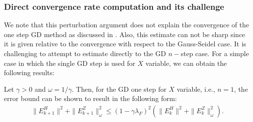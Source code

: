 \subsubsection{Direct convergence rate computation and its challenge}

We note that this perturbation argument does not explain the convergence of the one step GD method as discussed in \cite{mishchenko2022proxskip}. Also, this estimate can not be sharp since it is given relative to the convergence with respect to the Gauss-Seidel case. It is challenging to attempt to estimate directly to the GD $n-$step case. For a simple case in which the single GD step is used for $X$ variable, we can obtain the following results: 
\begin{lemma} 
Let $\gamma > 0$ and $\omega = 1/\gamma$. Then, for the GD one step for $X$ variable, i.e., $n = 1$, the error bound can be shown to result in the following form: 
\begin{eqnarray*}
\|E_{k+1}^H\|^2 + \|E_{k+1}^Z\|_\omega^2 \leq (1 - \gamma \lambda_F)^2 \left ( \|E_k^H\|^2 + \|E_k^Z\|_\omega^2 \right ).  
\end{eqnarray*}
\end{lemma} 
